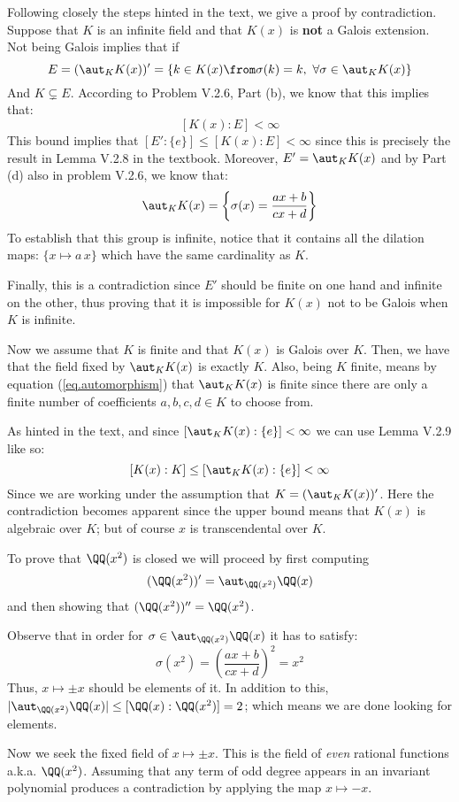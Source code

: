 Following closely the steps hinted in the text, we give a proof by contradiction. Suppose that $K$ is an infinite field and that $K(x)$ is \textbf{not }a Galois extension. Not being Galois implies that if 
$$E=(\aut_KK(x))'= \{ k \in K(x) \from  \sigma(k)=k, \ \forall \sigma \in \aut_KK(x) \} $$ 
And $K\subsetneq E$. According to Problem V.2.6, Part (b), we know that this implies that:
$$[K(x):E] <\infty$$
This bound implies that $[E':\{e\}]\leq [K(x):E]<\infty $ since this is precisely the result in Lemma V.2.8 in the textbook. Moreover, $E'= \aut_K K(x)$ and by Part (d) also in problem V.2.6, we know that:
\begin{equation}\label{eq.automorphism}
\aut_K K(x) = \left\{ \sigma(x) = \frac{ax+b}{cx+d}\right \}
\end{equation}
To establish that this group is infinite, notice that it contains all the dilation maps: $\{x\mapsto a\,x\}$ which have the same cardinality as $K$. 

Finally, this is a contradiction since $E'$ should be finite on one hand and infinite on the other, thus proving that it is impossible for $K(x)$ not to be Galois when $K$ is infinite.

Now we assume that $K$ is finite and that $K(x)$ is Galois over $K$. Then, we have that the field fixed by $\aut_K K(x)$ is exactly $K$. Also, being $K$ finite, means by equation (\ref{eq.automorphism}) that $\aut_K K(x)$ is finite since there are only  a finite number of coefficients $a,b,c,d\in K$ to choose from. 

As hinted in the text, and since $[\aut_K K(x):\{e\}]<\infty$ we can use Lemma V.2.9 like so:
$$[K(x):K] \leq [\aut_K K(x):\{e\}]<\infty$$
Since we are working under the assumption that $K = (\aut_K K(x))'$. Here the contradiction becomes apparent since the upper bound means that $K(x)$ is algebraic over $K$; but of course $x$ is transcendental over $K$.

To prove that $\QQ(x^2)$ is closed we will proceed by first computing 
$$(\QQ(x^2))'= \aut_{\QQ(x^2)}\QQ(x)$$
and then showing that $(\QQ(x^2))'' = \QQ(x^2)$.

Observe that in order for $\sigma \in \aut_{\QQ(x^2)}\QQ(x)$ it has to satisfy:
$$\sigma(x^2) = \left( \frac{ax+b}{cx+d}\right)^2=x^2$$
Thus, $x\mapsto \pm x$ should be elements of it. In addition to this, $|\aut_{\QQ(x^2)}\QQ(x)|\leq [\QQ(x):\QQ(x^2)]=2$; which means we are done looking for elements. 

Now we seek the fixed field of $x\mapsto \pm x$. This is the field of \emph{even} rational functions a.k.a. $\QQ(x^2)$. Assuming that any term of odd degree appears in an invariant polynomial produces a contradiction by applying the map $x\mapsto -x$.


